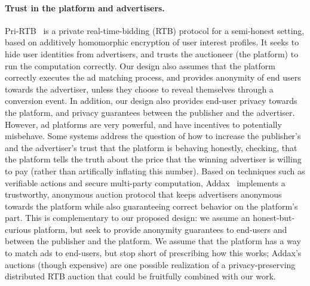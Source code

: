 \paragraph{Trust in the platform and advertisers.}
%
Pri-RTB~\cite{pri-rtb} is a private real-time-bidding (RTB) protocol for a
semi-honest setting, based on additively homomorphic encryption of user interest
profiles.
%
It seeks to hide user identities from advertisers, and trusts the
auctioneer (the platform) to run the computation correctly.
%
Our design also assumes that the platform correctly executes the ad matching process,
and provides anonymity of end users towards the advertiser, unless they choose to
reveal themselves through a conversion event.
%
%
In addition, our design also provides end-user privacy towards the platform, and privacy
guarantees between the publisher and the advertiser.
%
However, ad platforms are very powerful, and have incentives to potentially misbehave.
%
Some systems address the question of how to increase the publisher's and the advertiser's
trust that the platform is behaving honestly, checking, \eg that the platform tells the
truth about the price that the winning advertiser is willing to pay (rather than artifically
inflating this number).
%
Based on techniques such as verifiable actions and secure multi-party computation, Addax~\cite{addax} implements a trustworthy, anonymous auction protocol that keeps advertisers anonymous towards the platform while also guaranteeing correct behavior on the platform's part.
%
This is complementary to our proposed design: we assume an honest-but-curious platform, but seek to provide anonymity guarantees to end-users and between the publisher and the platform.
%
We assume that the platform has a way to match ads to end-users, but stop short of prescribing how this works; Addax's auctions (though expensive) are one possible realization of a privacy-preserving distributed RTB auction that could be fruitfully combined with our work.
%
%

%
%
